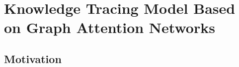 \chapter{Knowledge Tracing Model Based on Graph Attention Networks}

\ifpdf
    \graphicspath{{Chapter3/Figs/Raster/}{Chapter3/Figs/PDF/}{Chapter3/Figs/}}
\else
    \graphicspath{{Chapter3/Figs/Vector/}{Chapter3/Figs/}}
\fi

\section{Motivation}

